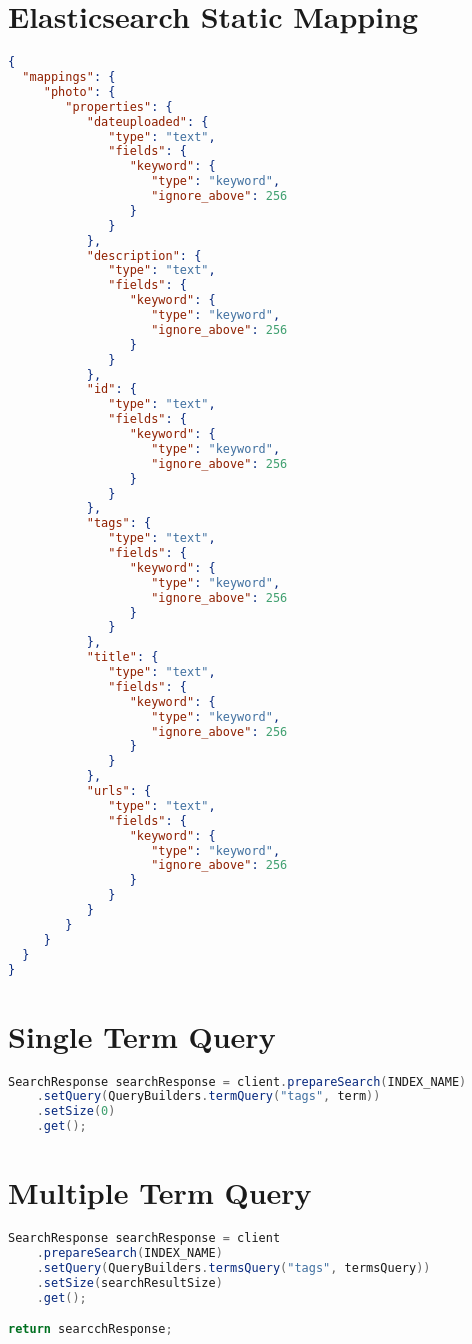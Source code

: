 \section{Elasticsearch Static Mapping}
\begin{lstlisting}[language={json}, caption={The static Elasticsearch mapping used on the photo index in the experiment setup.}, label={ap:elasticsearch-mapping}]
{
  "mappings": {
     "photo": {
        "properties": {
           "dateuploaded": {
              "type": "text",
              "fields": {
                 "keyword": {
                    "type": "keyword",
                    "ignore_above": 256
                 }
              }
           },
           "description": {
              "type": "text",
              "fields": {
                 "keyword": {
                    "type": "keyword",
                    "ignore_above": 256
                 }
              }
           },
           "id": {
              "type": "text",
              "fields": {
                 "keyword": {
                    "type": "keyword",
                    "ignore_above": 256
                 }
              }
           },
           "tags": {
              "type": "text",
              "fields": {
                 "keyword": {
                    "type": "keyword",
                    "ignore_above": 256
                 }
              }
           },
           "title": {
              "type": "text",
              "fields": {
                 "keyword": {
                    "type": "keyword",
                    "ignore_above": 256
                 }
              }
           },
           "urls": {
              "type": "text",
              "fields": {
                 "keyword": {
                    "type": "keyword",
                    "ignore_above": 256
                 }
              }
           }
        }
     }
  }
}
\end{lstlisting}

\section{Single Term Query}
\begin{lstlisting}[language={java}, caption={Java code used to search for a single term.}, label={ap:single-term-query}]
  SearchResponse searchResponse = client.prepareSearch(INDEX_NAME)
    .setQuery(QueryBuilders.termQuery("tags", term))
    .setSize(0)
    .get();
\end{lstlisting}

\section{Multiple Term Query}
\begin{lstlisting}[language={java}, caption={Java code used to search for multiple terms.}, label={ap:multiple-term-query}]
SearchResponse searchResponse = client
    .prepareSearch(INDEX_NAME)
    .setQuery(QueryBuilders.termsQuery("tags", termsQuery))
    .setSize(searchResultSize)
    .get();

return searcchResponse;
\end{lstlisting}

